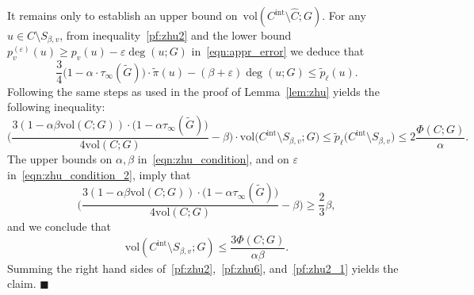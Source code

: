 \documentclass[twoside,11pt]{article}
\newcommand{\1}{\mathbf{1}}
\newcommand{\wt}[1]{\widetilde{#1}}
\newcommand{\wh}[1]{\widehat{#1}}
\newcommand{\vol}{\mathrm{vol}}
\newcommand{\qed}{\hfill $\blacksquare$}
\begin{document}
It remains only to establish an upper bound on~$\vol(C^{\mathrm{int}} \setminus \wh{C};G)$. For any $u \in C \setminus S_{\beta,v}$, from inequality~\eqref{pf:zhu2} and the lower bound $p_v^{(\varepsilon)}(u) \geq p_v(u)  - \varepsilon \deg(u;G)$ in~\eqref{eqn:appr_error} we deduce that
\begin{equation}
\frac{3}{4}\bigl(1 - \alpha \cdot \tau_{\infty}(\wt{G})\bigr) \cdot \wt{\pi}(u) -  (\beta + \varepsilon)\deg(u;G) \leq \wt{p}_{\ell}(u).
\end{equation}
Following the same steps as used in the proof of Lemma~\ref{lem:zhu} yields the following inequality:
\begin{equation*}
\biggl(\frac{3(1 - \alpha \beta \vol(C;G))\cdot\bigl(1 - \alpha \tau_{\infty}(\wt{G})\bigr)}{4\vol(C;G)} - \beta\biggr) \cdot \vol\bigl(C^{\mathrm{int}} \setminus S_{\beta,v}; G\bigr) \leq \wt{p}_{\ell}\bigl(C^{\mathrm{int}} \setminus S_{\beta,v}\bigr) \leq 2\frac{\Phi(C;G)}{\alpha}.
\end{equation*}
The upper bounds on $\alpha,\beta$ in~\eqref{eqn:zhu_condition},  and on $\varepsilon$ in~\eqref{eqn:zhu_condition_2}, imply that
\begin{equation*}
\biggl(\frac{3(1 - \alpha \beta \vol(C;G))\cdot\bigl(1 - \alpha \tau_{\infty}(\wt{G})\bigr)}{4\vol(C;G)} - \beta\biggr) \geq \frac{2}{3}\beta,
\end{equation*}
and we conclude that
\begin{equation}
\label{pf:zhu2_1}
\vol(C^{\mathrm{int}} \setminus S_{\beta,v}; G) \leq \frac{3\Phi(C;G)}{\alpha\beta}.
\end{equation}
Summing the right hand sides of~\eqref{pf:zhu2},~\eqref{pf:zhu6}, and~\eqref{pf:zhu2_1} yields the claim. \qed
\end{document}
